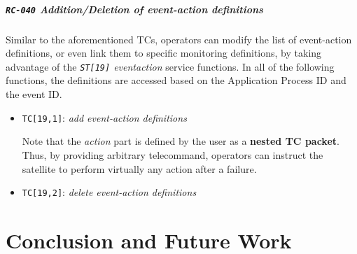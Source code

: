 \documentclass[a4paper,nobib]{tufte-book}
\begin{document}
	\paragraph{\textbf{\texttt{RC-040} Addition/Deletion of event-action definitions}}\hspace{0pt}
	
	Similar to the aforementioned \acsp{TC}, operators can modify the list of event-action definitions, or even link them to specific monitoring definitions, by taking advantage of the \emph{\texttt{ST[19]} eventaction} service functions. In all of the following functions, the definitions are accessed based on the Application Process ID and the event ID.
	

		
	\begin{itemize}
		\item \texttt{TC[19,1]}: \emph{add event-action definitions}
		
		Note that the \emph{action} part is defined by the user as a \textbf{nested \acs{TC} packet}. Thus, by providing arbitrary telecommand, operators can instruct the satellite to perform virtually any action after a failure.
		
		\item \texttt{TC[19,2]}: \emph{delete event-action definitions}
		
	\end{itemize}

\chapter{Conclusion and Future Work}
\label{cap:conclusion}
\end{document}
